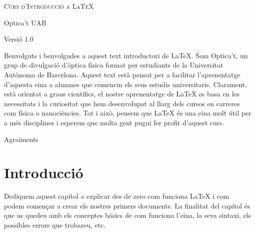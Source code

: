 \documentclass[15pt,twosides,onecolumn,openany]{book}
\begin{document}
\newpage
\thispagestyle{empty}
\begin{titlepage}
    \centering
    \vspace*{\fill}  
    {\Huge \textsc{Curs d'Introducció a \LaTeX{}} \par}
    \vspace{1cm}
    {\Large Optica't UAB \par}
    \vspace{0.5cm}
    {\large Versió 1.0 \par}
    \vspace{5cm}
    \vspace*{\fill} 
\end{titlepage}


\newpage

\thispagestyle{empty}
Benvolguts i benvolgudes a aquest text introductori de LaTeX. Som Optica't, un grup de divulgació d'òptica física format per estudiants de la Universitat Autònoma de Barcelona. Aquest text està pensat per a facilitar l'aprenentatge d'aquesta eina a alumnes que comencin els seus estudis universitaris. Clarament, està orientat a graus científics, el nostre aprenentatge de LaTeX es basa en les necessitats i la curiositat que hem desenvolupat al llarg dels cursos en carreres com física o nanociències. Tot i això, pensem que LaTeX és una eina molt útil per a més disciplines i esperem que molta gent pugui fer profit d'aquest curs.

\newpage
\tableofcontents
\pagestyle{empty}
\newpage
Agraïments
\newpage
\pagestyle{fancy}
\chapter{Introducció}
\thispagestyle{empty}

Dediquem aquest capítol a explicar des de zero com funciona LaTeX i com podem començar a crear els nostres primers documents. La finalitat del capítol és que us quedeu amb els conceptes bàsics de com funciona l'eina, la seva sintaxi, els possibles errors que trobareu, etc.
\end{document}
